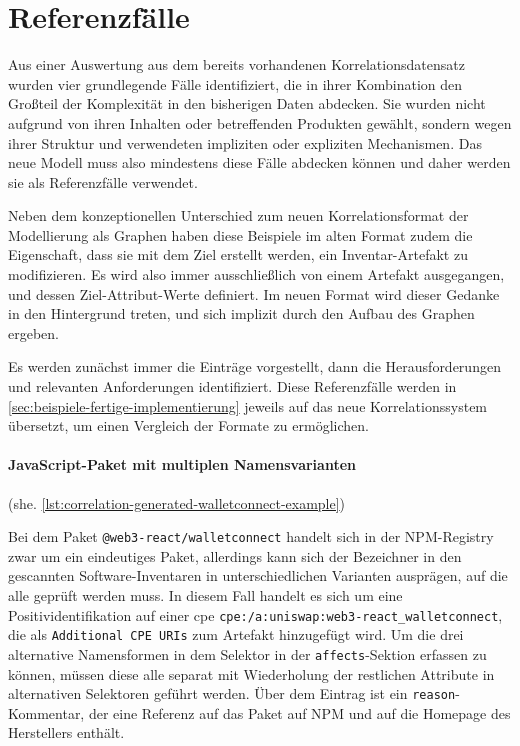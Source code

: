 \section{Referenzfälle}\label{sec:reference-case-chapter}

Aus einer Auswertung aus dem bereits vorhandenen Korrelationsdatensatz wurden vier grundlegende Fälle identifiziert, die in ihrer Kombination den Großteil der Komplexität in den bisherigen Daten abdecken.
Sie wurden nicht aufgrund von ihren Inhalten oder betreffenden Produkten gewählt, sondern wegen ihrer Struktur und verwendeten impliziten oder expliziten Mechanismen.
Das neue Modell muss also mindestens diese Fälle abdecken können und daher werden sie als Referenzfälle verwendet.

Neben dem konzeptionellen Unterschied zum neuen Korrelationsformat der Modellierung als Graphen haben diese Beispiele im alten Format zudem die Eigenschaft, dass sie mit dem Ziel erstellt werden, ein Inventar-Artefakt zu modifizieren.
Es wird also immer ausschließlich von einem Artefakt ausgegangen, und dessen Ziel-Attribut-Werte definiert.
Im neuen Format wird dieser Gedanke in den Hintergrund treten, und sich implizit durch den Aufbau des Graphen ergeben.

Es werden zunächst immer die Einträge vorgestellt, dann die Herausforderungen und relevanten Anforderungen identifiziert.
Diese Referenzfälle werden in \autoref{sec:beispiele-fertige-implementierung} jeweils auf das neue Korrelationssystem übersetzt, um einen Vergleich der Formate zu ermöglichen.

\paragraph{JavaScript-Paket mit multiplen Namensvarianten}\label{par:reference-case-walletconnect} (she. \autoref{lst:correlation-generated-walletconnect-example})

Bei dem Paket \texttt{@web3-react/walletconnect} handelt sich in der NPM-Registry zwar um ein eindeutiges Paket, allerdings kann sich der Bezeichner in den gescannten Software-Inventaren in unterschiedlichen Varianten ausprägen, auf die alle geprüft werden muss.
In diesem Fall handelt es sich um eine Positividentifikation auf einer \acrshort{cpe} \texttt{cpe:/a:uniswap:web3-react\_walletconnect}, die als \texttt{Additional CPE URIs} zum Artefakt hinzugefügt wird.
Um die drei alternative Namensformen in dem Selektor in der \texttt{affects}-Sektion erfassen zu können, müssen diese alle separat mit Wiederholung der restlichen Attribute in alternativen Selektoren geführt werden.
Über dem Eintrag ist ein \texttt{reason}-Kommentar, der eine Referenz auf das Paket auf NPM und auf die Homepage des Herstellers enthält.

